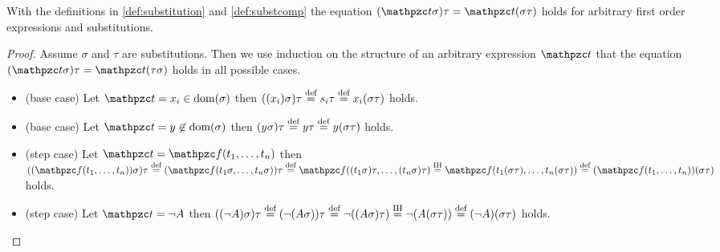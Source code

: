 \begin{lemma}\label{lem:substitution}
	With the definitions in \ref{def:substitution} and \ref{def:substcomp} the equation
	$(\mct\sigma)\tau = \mct(\sigma\tau)$ holds for
	arbitrary first order expressions and substitutions.
\end{lemma}

\begin{proof}
	Assume $\sigma$ and $\tau$ are substitutions. 
	Then we use induction on the structure of an arbitrary expression $\mct$
	that the equation $(\mct\sigma)\tau =  \mct(\tau\sigma)$ holds in all possible cases.
	\begin{itemize}
		\item (base case) Let $\mct = x_i \in\dom(\sigma)$ then
		$((x_i)\sigma)\tau\defEQ s_i\tau\defEQ x_i(\sigma\tau)$ holds.
		
		\item (base case) Let $\mct = y \not\in\dom(\sigma)$ then
		$(y\sigma)\tau \defEQ y\tau \defEQ y(\sigma\tau)$ holds. 
		
		\item (step case) Let $\mct = \mcf(t_1,\ldots,t_n)$ 
		then
		$((\mcf(t_1,\ldots,t_n))\sigma)\tau
		\defEQ 
		(\mcf(t_1\sigma,\ldots,t_n\sigma))\tau
		\defEQ 
		\mcf((t_1\sigma)\tau,\ldots,(t_n\sigma)\tau)
		\defEQ[IH]
		\mcf(t_1(\sigma\tau),\ldots,t_n(\sigma\tau))
		\defEQ
		(\mcf(t_1,\ldots,t_n))(\sigma\tau)
		$ holds.
		
		\item (step case) Let $\mct = \lnot A$ then
		$((\lnot A)\sigma)\tau 
		\defEQ 
		(\lnot(A\sigma))\tau 
		\defEQ 
		\lnot((A\sigma)\tau)
		\defEQ[IH]
		\lnot(A(\sigma\tau))
		\defEQ 
		(\lnot A)(\sigma\tau)
		$ holds.
	\end{itemize}
\end{proof}

